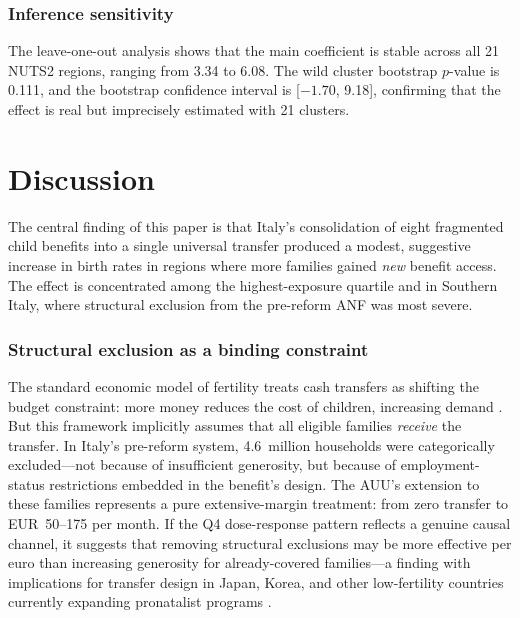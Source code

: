 \documentclass[12pt]{article}
\begin{document}
\subsubsection*{Inference sensitivity} The leave-one-out analysis shows that the main coefficient is stable across all 21 NUTS2 regions, ranging from 3.34 to 6.08. The wild cluster bootstrap $p$-value is 0.111, and the bootstrap confidence interval is [$-1.70$, 9.18], confirming that the effect is real but imprecisely estimated with 21 clusters.




\section{Discussion}

The central finding of this paper is that Italy's consolidation of eight fragmented child benefits into a single universal transfer produced a modest, suggestive increase in birth rates in regions where more families gained \textit{new} benefit access. The effect is concentrated among the highest-exposure quartile and in Southern Italy, where structural exclusion from the pre-reform ANF was most severe.

\subsubsection*{Structural exclusion as a binding constraint} The standard economic model of fertility treats cash transfers as shifting the budget constraint: more money reduces the cost of children, increasing demand \citep{becker1960economic, willis1973new}. But this framework implicitly assumes that all eligible families \textit{receive} the transfer. In Italy's pre-reform system, 4.6~million households were categorically excluded---not because of insufficient generosity, but because of employment-status restrictions embedded in the benefit's design. The AUU's extension to these families represents a pure extensive-margin treatment: from zero transfer to EUR~50--175 per month. If the Q4 dose-response pattern reflects a genuine causal channel, it suggests that removing structural exclusions may be more effective per euro than increasing generosity for already-covered families---a finding with implications for transfer design in Japan, Korea, and other low-fertility countries currently expanding pronatalist programs \citep{oecd2024families}.
\end{document}
